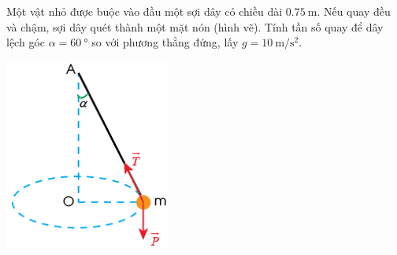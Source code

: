 \begin{ex}
	Một vật nhỏ được buộc vào đầu một sợi dây có chiều dài $\SI{0.75}{\meter}$. Nếu quay đều và chậm, sợi dây quét thành một mặt nón (hình vẽ). Tính tần số quay để dây lệch góc $\alpha=\SI{60}{\degree}$ so với phương thẳng đứng, lấy $g=\SI{10}{\meter/\second^2}$.
	\begin{center}
		\includegraphics[width=0.25\linewidth]{../figs/VN10-2023-PH-TP032-P-2}
	\end{center}
\end{ex}
